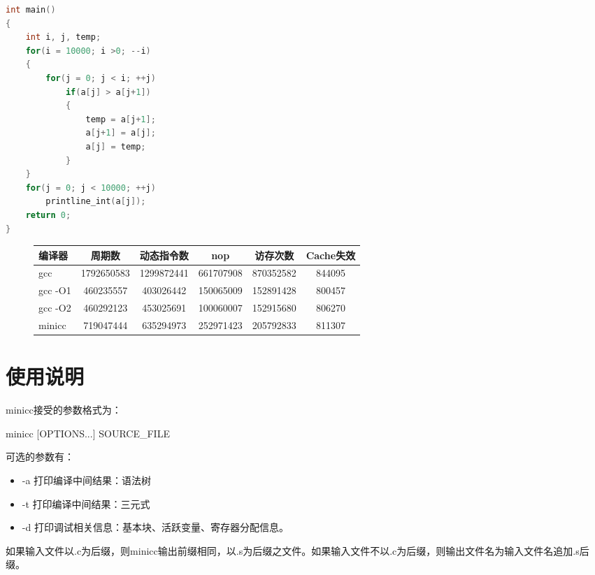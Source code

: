 \documentclass[12pt,a4paper,Flow]{report}
\begin{document}
\begin{enumerate}
\begin{lstlisting}[language=c]
int main()
{
    int i, j, temp;
    for(i = 10000; i >0; --i)
    {
        for(j = 0; j < i; ++j)
            if(a[j] > a[j+1])
            {
                temp = a[j+1];
                a[j+1] = a[j];
                a[j] = temp;
            }
    }
    for(j = 0; j < 10000; ++j)
        printline_int(a[j]);
    return 0;
}
\end{lstlisting}
\begin{figure}[H]
\centering
\begin{tabular}{|l|c|c|c|c|c|}
\hline
编译器 & 周期数 & 动态指令数 & nop & 访存次数 & Cache失效 \\ 
\hline
gcc   & 1792650583 & 1299872441 & 661707908 & 870352582 & 844095 \\
\hline
gcc -O1 & 460235557 & 403026442 & 150065009 & 152891428 & 800457 \\
\hline
gcc -O2 & 460292123 & 453025691 & 100060007 & 152915680 & 806270 \\
\hline
minicc & 719047444 & 635294973 &  252971423 & 205792833 & 811307 \\
\hline
\end{tabular}
\end{figure}
\end{enumerate}
\chapter{使用说明}
minicc接受的参数格式为：
\begin{center}
  minicc [OPTIONS...] SOURCE\_FILE
\end{center}
可选的参数有：
\begin{itemize}
\item -a 打印编译中间结果：语法树
\item -t 打印编译中间结果：三元式
\item -d 打印调试相关信息：基本块、活跃变量、寄存器分配信息。
\end{itemize}
如果输入文件以.c为后缀，则minicc输出前缀相同，以.s为后缀之文件。如果输入文件不以.c为后缀，则输出文件名为输入文件名追加.s后缀。
\end{document}

